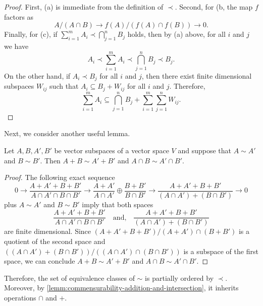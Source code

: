\begin{proof}
	First, (a) is immediate from the definition of $\prec$. Second, for (b, the map $f$ factors as
	\[
		A/(A\cap B) \to f(A)/(f(A)\cap f(B)) \to 0.
	\]
	Finally, for (c), if $\sum_{i=1}^{m} A_{i} \prec \bigcap_{j=1}^{n} B_{j}$ holds, then by (a) above, for all $i$ and $j$ we have
	\[
		A_{i} \prec \sum_{i=1}^{m} A_{i} \prec \bigcap_{j=1}^{n} B_{j} \prec B_{j}.
	\]
	On the other hand, if $A_{i} \prec B_{j}$ for all $i$ and $j$, then there exist finite dimensional subspaces $W_{ij}$ such that $A_{i} \subseteq B_{j} + W_{ij}$ for all $i$ and $j$. Therefore,
	\[
		\sum_{i=1}^{m} A_{i} \subseteq \bigcap_{j=1}^{n} B_{j} + \sum_{i=1}^{m} \sum_{j=1}^{n} W_{ij}.
	\]

\end{proof}
Next, we consider another useful lemma.
\begin{lemma}\label{lemm:commensurability-addition-and-intersection}
	Let $A,B,A',B'$ be vector subspaces of a vector space $V$ and suppose that $A \sim A'$ and $B \sim B'$. Then $A + B \sim A' + B'$ and $A \cap B \sim A' \cap B'$.
\end{lemma}
\begin{proof}
	The following exact sequence 
	\small
	\[
		0 \to \frac{A + A' + B + B'}{A\cap A'\cap B\cap B'} \to \frac{A + A'}{A \cap A'} \oplus \frac{B + B'}{B \cap B'} \to \frac{A + A' + B + B'}{(A\cap A') + (B\cap B')} \to 0
	\]
	\normalsize
	plus $A \sim A'$ and $B \sim B'$ imply that both spaces
	\[
		\frac{A + A' + B + B'}{A\cap A'\cap B\cap B'} \quad\text{and,}\quad
		 \frac{A + A' + B + B'}{(A\cap A') + (B\cap B')}
	\]	
	are finite dimensional. Since $(A + A' + B + B')/(A+A')\cap(B+B')$ is a quotient of the second space and $((A \cap A') + (B \cap B'))/((A\cap A')\cap(B\cap B'))$ is a subspace of the first space, we can conclude $A + B \sim A' + B'$ and $A \cap B \sim A' \cap B'$.
\end{proof}
Therefore, the set of equivalence classes of $\sim$ is partially ordered by $\prec$. Moreover, by \cref{lemm:commensurability-addition-and-intersection}, it inherits operations $\cap$ and $+$.
